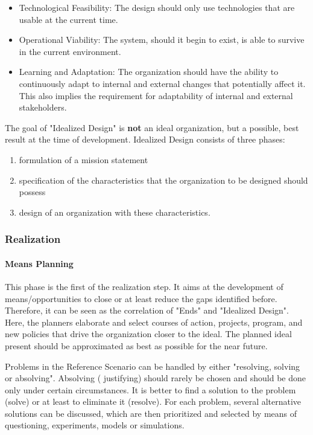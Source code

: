 \documentclass[a4paper,12pt]{scrartcl}
\begin{document}
\begin{itemize}
\item Technological Feasibility: The design should only use technologies that are usable at the current time.

\item Operational Viability: The system, should it begin to exist, is able to survive in the current environment.

\item Learning and Adaptation: The organization should have the ability to continuously adapt to internal and external changes that potentially affect it. This also implies  the requirement for adaptability of internal and external stakeholders.
\end{itemize}

The goal of "Idealized Design" is \textbf{not} an ideal organization, but a possible, best result at the time of development.
Idealized Design consists of three phases:

\begin{enumerate}
\item formulation of a mission statement
\item specification of the characteristics that the organization to be designed should possess
\item design of an organization with these characteristics.
\end{enumerate}

\subsubsection{Realization}

\paragraph{Means Planning} 

This phase is the first of the realization step. It aims at the development of means/opportunities to close or at least reduce the gaps identified before.  Therefore, it can be seen as the correlation of "Ends" and "Idealized Design". Here, the planners elaborate and select courses of action, projects, program, and new policies that drive the organization closer to the ideal.
The planned ideal present should be approximated as best as possible for the near future.

Problems in the Reference Scenario can be handled by either "resolving, solving or absolving".\cite{ackoff:1981} Absolving ( justifying) should rarely be chosen and should be done only under certain circumstances.
It is better to find a solution to the problem (solve) or at least to eliminate it (resolve).  For each problem, several alternative solutions can be discussed, which are then prioritized and selected by means of questioning, experiments, models or simulations.\cite{ackoff:1981}
\end{document}
